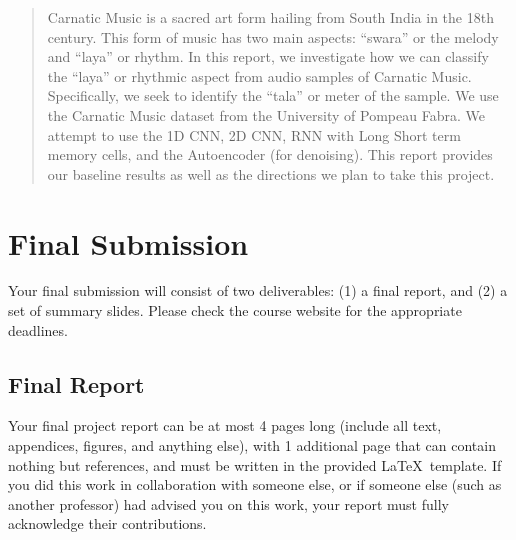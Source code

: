 \documentclass{article}
\begin{document}
 


\begin{abstract} 
Carnatic Music is a sacred art form hailing from South India in the 18th century. This form of music has two main aspects: “swara” or the melody and “laya” or rhythm. In this report, we investigate how we can classify the “laya” or rhythmic aspect from audio samples of Carnatic Music. Specifically, we seek to identify the “tala” or meter of the sample. We use the Carnatic Music dataset from the University of Pompeau Fabra. We attempt to use the 1D CNN, 2D CNN, RNN with Long Short term memory cells, and the Autoencoder (for denoising). This report provides our baseline results as well as the directions we plan to take this project.
\end{abstract} 


\section{Final Submission}

Your final submission will consist of two deliverables:  (1) a final report, and (2) a set of summary slides. Please check the course website for the appropriate deadlines. 

\subsection{Final Report}

Your final project report can be at most 4 pages long (include all text, appendices, figures, and anything else), with 1 additional page that can contain nothing but references, and must be written in the provided \LaTeX\ template. If you did this work in collaboration with someone else, or if someone else (such as another professor) had advised you on this work, your report must fully acknowledge their contributions. 
\end{document}
